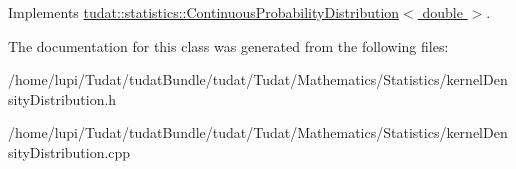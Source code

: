 Implements \hyperlink{classtudat_1_1statistics_1_1ContinuousProbabilityDistribution_a7edfe6753ce63fe4e12409d3fb88e499}{tudat\+::statistics\+::\+Continuous\+Probability\+Distribution$<$ double $>$}.



The documentation for this class was generated from the following files\+:\begin{DoxyCompactItemize}
\item 
/home/lupi/\+Tudat/tudat\+Bundle/tudat/\+Tudat/\+Mathematics/\+Statistics/kernel\+Density\+Distribution.\+h\item 
/home/lupi/\+Tudat/tudat\+Bundle/tudat/\+Tudat/\+Mathematics/\+Statistics/kernel\+Density\+Distribution.\+cpp\end{DoxyCompactItemize}

